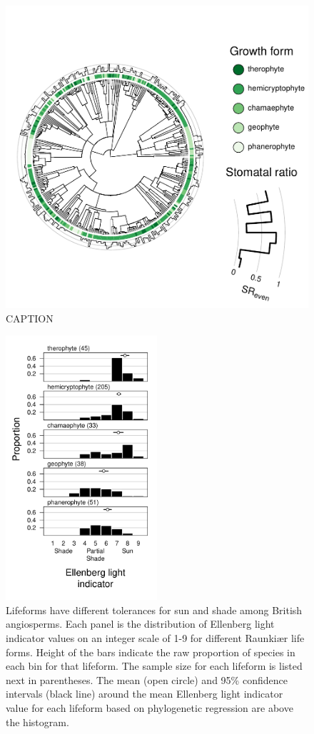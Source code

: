 \documentclass[12pt, oneside]{article}
\begin{document}
\begin{figure}[ht]
\centerline{\includegraphics[width=\textwidth]{figures/figure_phylo-lifeform.pdf}}
\caption{CAPTION} 
\label{fig:phylo-lifeform}
\end{figure}

\begin{figure}[ht]
\centerline{\includegraphics[width=0.5\textwidth]{figures/figure_lf-light.pdf}}
\caption{Lifeforms have different tolerances for sun and shade among British angiosperms. Each panel is the distribution of Ellenberg light indicator values on an integer scale of 1-9 for different Raunki\ae r life forms. Height of the bars indicate the raw proportion of species in each bin for that lifeform. The sample size for each lifeform is listed next in parentheses. The mean (open circle) and 95\% confidence intervals (black line) around the mean Ellenberg light indicator value for each lifeform based on phylogenetic regression are above the histogram.} 
\label{fig:lf-light}
\end{figure}
\end{document}

